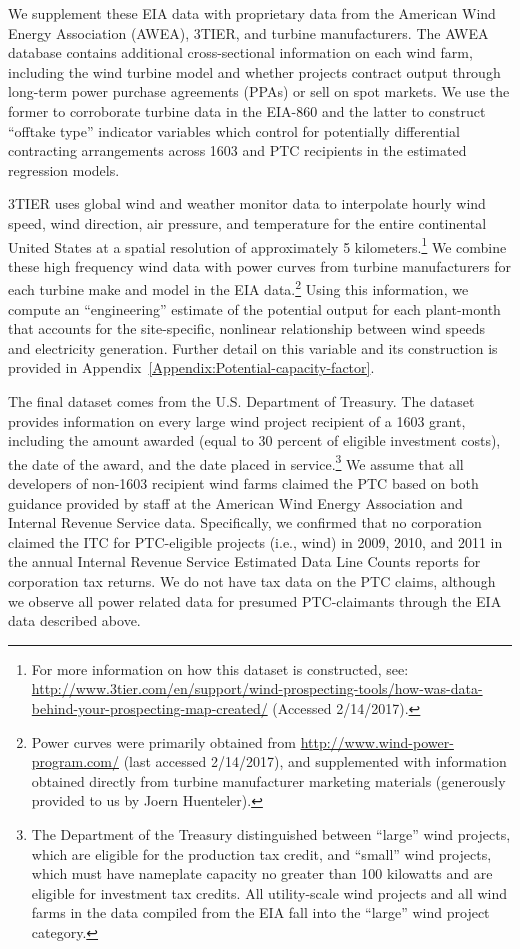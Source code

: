 \documentclass[12pt]{article}
\begin{document}
We supplement these EIA data with proprietary data from the American Wind Energy Association (AWEA), 3TIER, and turbine manufacturers. The AWEA database contains additional cross-sectional information on each wind farm, including the wind turbine model and whether projects contract output through long-term power purchase agreements (PPAs) or sell on spot markets. We use the former to corroborate turbine data in the EIA-860 and the latter to construct ``offtake type'' indicator variables which control for potentially differential contracting arrangements across 1603 and PTC recipients in the estimated regression models.

3TIER uses global wind and weather monitor data to interpolate hourly wind speed, wind direction, air pressure, and temperature for the entire continental United States at a spatial resolution of approximately 5 kilometers.\footnote{For more information on how this dataset is constructed, see: \href{http://www.3tier.com/en/support/wind-prospecting-tools/how-was-data-behind-your-prospecting-map-created/}{http://www.3tier.com/en/support/wind-prospecting-tools/how-was-data-behind-your-prospecting-map-created/} (Accessed 2/14/2017).} We combine these high frequency wind data with power curves from turbine manufacturers for each turbine make and model in the EIA data.\footnote{Power curves were primarily obtained from \href{http://www.wind-power-program.com/}{http://www.wind-power-program.com/} (last accessed 2/14/2017), and supplemented with information obtained directly from turbine manufacturer marketing materials (generously provided to us by Joern Huenteler).} Using this information, we compute an ``engineering'' estimate of the potential output for each plant-month that accounts for the site-specific, nonlinear relationship between wind speeds and electricity generation. Further detail on this variable and its construction is provided in Appendix~\ref{Appendix:Potential-capacity-factor}.

The final dataset comes from the U.S. Department of Treasury. The dataset provides information on every large wind project recipient of a 1603 grant, including the amount awarded (equal to 30 percent of eligible investment costs), the date of the award, and the date placed in service.\footnote{The Department of the Treasury distinguished between ``large'' wind projects, which are eligible for the production tax credit, and ``small'' wind projects, which must have nameplate capacity no greater than 100 kilowatts and are eligible for investment tax credits. All utility-scale wind projects and all wind farms in the data compiled from the EIA fall into the ``large'' wind project category. } We assume that all developers of non-1603 recipient wind farms claimed the PTC based on both guidance provided by staff at the American Wind Energy Association and Internal Revenue Service data. Specifically, we confirmed that no corporation claimed the ITC for PTC-eligible projects (i.e., wind) in 2009, 2010, and 2011 in the annual Internal Revenue Service Estimated Data Line Counts reports for corporation tax returns. We do not have tax data on the PTC claims, although we observe all power related data for presumed PTC-claimants through the EIA data described above.
\end{document}
